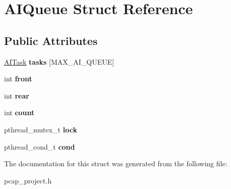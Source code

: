 \hypertarget{structAIQueue}{}\section{A\+I\+Queue Struct Reference}
\label{structAIQueue}
\subsection*{Public Attributes}
\begin{DoxyCompactItemize}
\item 
\mbox{\label{structAIQueue_a370cc114dd420c6255b9274675141099}} 
\mbox{\hyperlink{structAITask}{A\+I\+Task}} {\bfseries tasks} \mbox{[}M\+A\+X\+\_\+\+A\+I\+\_\+\+Q\+U\+E\+UE\mbox{]}
\item 
\mbox{\label{structAIQueue_ae271f2bafc95d043dc5014abc7fc4254}} 
int {\bfseries front}
\item 
\mbox{\label{structAIQueue_aaefacf4d816a475cf1e7dfb37b036c2f}} 
int {\bfseries rear}
\item 
\mbox{\label{structAIQueue_a96925098f99de8fe935900c78cfa9590}} 
int {\bfseries count}
\item 
\mbox{\label{structAIQueue_a774d243f9645d8a02eb15e284899e885}} 
pthread\+\_\+mutex\+\_\+t {\bfseries lock}
\item 
\mbox{\label{structAIQueue_adbf48cc0b36eb7bd667a251db15a1e9e}} 
pthread\+\_\+cond\+\_\+t {\bfseries cond}
\end{DoxyCompactItemize}


The documentation for this struct was generated from the following file\+:\begin{DoxyCompactItemize}
\item 
pcap\+\_\+project.\+h\end{DoxyCompactItemize}
